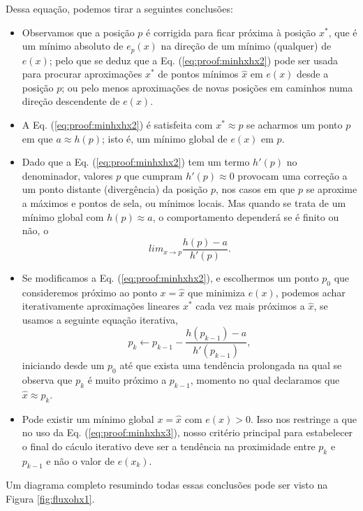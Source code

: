 \begin{myproofT}
Dessa equação, podemos tirar a seguintes conclusões:
\begin{itemize}

\item Observamos que a posição $p$ é corrigida para ficar próxima à posição $x^*$, 
que é um mínimo absoluto de $e_p(x)$ na direção de um mínimo (qualquer) de $e(x)$;
pelo que se deduz que a Eq. (\ref{eq:proof:minhxhx2})
pode ser usada para procurar aproximações $x^*$ de pontos mínimos $\hat{x}$ em $e(x)$ desde a posição $p$;
ou pelo menos aproximações de novas posições em caminhos numa direção descendente de $e(x)$.

\item A Eq. (\ref{eq:proof:minhxhx2}) é satisfeita 
com $x^* \approx p$ se acharmos um  
ponto $p$ em que  $a \approx h(p)$; 
isto é, um mínimo global de $e(x)$ em $p$.%

\item Dado que a Eq. (\ref{eq:proof:minhxhx2}) tem um termo $h'(p)$ no denominador,
valores $p$ que cumpram $h'(p)\approx 0$ provocam uma correção a um ponto distante (divergência) da posição $p$,
nos casos em que $p$ se aproxime a máximos e pontos de sela,
ou mínimos locais. 
Mas quando se trata de um mínimo global com $h(p)\approx a$, 
o comportamento dependerá se é finito ou não, o
\begin{equation}
lim_{x\rightarrow p } \frac{h(p)-a}{h'(p)}.
\end{equation}

\item Se modificamos a Eq. (\ref{eq:proof:minhxhx2}), e escolhermos um ponto  
$p_0$ que consideremos próximo ao ponto $x=\hat{x}$ que minimiza $e(x)$,
podemos achar iterativamente aproximações lineares $x^*$ cada vez mais próximos a  $\hat{x}$,
se usamos a seguinte equação iterativa,
\begin{equation}\label{eq:proof:minhxhx3}
p_{k} \leftarrow p_{k-1} - \frac{ h(p_{k-1})-a}{h'(p_{k-1})},
\end{equation}
iniciando desde um $p_{0}$ 
até que exista uma tendência prolongada na qual se observa que $p_{k}$ é muito próximo a $p_{k-1}$,
momento no qual declaramos que $\hat{x} \approx p_{k}$.
\item Pode existir um mínimo global $x=\hat{x}$ com $e(x)>0$.
Isso nos restringe a que no uso da Eq. (\ref{eq:proof:minhxhx3}),
nosso critério principal para estabelecer o final do cáculo iterativo
deve ser a tendência na  proximidade entre $p_{k}$ e $p_{k-1}$ 
e não o valor de $e(x_k)$.
\end{itemize}

Um diagrama completo resumindo todas essas conclusões pode ser visto na Figura \ref{fig:fluxohx1}.
\end{myproofT}



